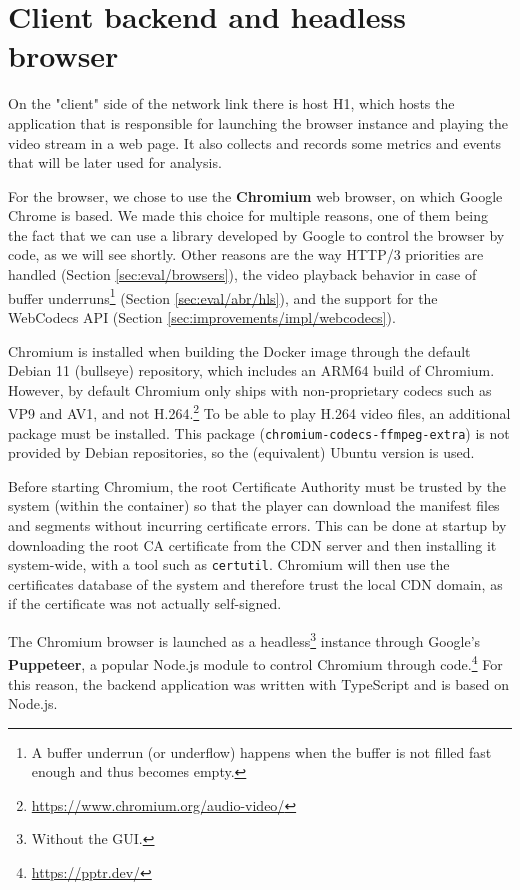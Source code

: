 \section{Client backend and headless browser}
\label{sec:testbed/backend}

On the "client" side of the network link there is host H1, which hosts the application that is responsible for launching the browser instance and playing the video stream in a web page. It also collects and records some metrics and events that will be later used for analysis.

For the browser, we chose to use the \textbf{Chromium} web browser, on which Google Chrome is based. We made this choice for multiple reasons, one of them being the fact that we can use a library developed by Google to control the browser by code, as we will see shortly. Other reasons are the way HTTP/3 priorities are handled (Section \ref{sec:eval/browsers}), the video playback behavior in case of buffer underruns\footnote{A buffer underrun (or underflow) happens when the buffer is not filled fast enough and thus becomes empty.} (Section \ref{sec:eval/abr/hls}), and the support for the WebCodecs API (Section \ref{sec:improvements/impl/webcodecs}).

Chromium is installed when building the Docker image through the default Debian 11 (bullseye) repository, which includes an ARM64 build of Chromium. However, by default Chromium only ships with non-proprietary codecs such as VP9 and AV1, and not H.264.\footnote{\url{https://www.chromium.org/audio-video/}} To be able to play H.264 video files, an additional package must be installed. This package (\texttt{chromium-codecs-ffmpeg-extra}) is not provided by Debian repositories, so the (equivalent) Ubuntu version is used.

Before starting Chromium, the root Certificate Authority must be trusted by the system (within the container) so that the player can download the manifest files and segments without incurring certificate errors. This can be done at startup by downloading the root CA certificate from the CDN server and then installing it system-wide, with a tool such as \texttt{certutil}. Chromium will then use the certificates database of the system and therefore trust the local CDN domain, as if the certificate was not actually self-signed.

The Chromium browser is launched as a headless\footnote{Without the GUI.} instance through Google's \textbf{Puppeteer}, a popular Node.js module to control Chromium through code.\footnote{\url{https://pptr.dev/}} For this reason, the backend application was written with TypeScript and is based on Node.js.

